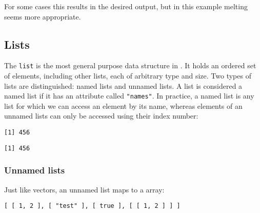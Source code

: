 For some cases this results in the desired output, but in this example melting seems more appropriate.

\subsection{Lists}

The \texttt{list} is the most general purpose data structure in \R.  It holds an ordered set of elements, including other lists, each of arbitrary type and size. Two types of lists are distinguished: named lists and unnamed lists. A list is considered a named list if it has an attribute called \texttt{"names"}. In practice, a named list is any list for which we can access an element by its name, whereas elements of an unnamed lists can only be accessed using their index number:

\begin{knitrout}\mycodesize
{}\color{fgcolor}\begin{kframe}
\begin{alltt}
 \hlkwb{<-} \hlstd{(} \hlstd{=} \hlstd{,}  \hlstd{=} \hlstd{)}
\hlopt{$}
\end{alltt}
\begin{verbatim}
[1] 456
\end{verbatim}
\begin{alltt}
 \hlkwb{<-} \hlstd{(}\hlstd{,} \hlstd{)}
\hlstd{(mylist2[[}\hlstd{]])}
\end{alltt}
\begin{verbatim}
[1] 456
\end{verbatim}
\end{kframe}
\end{knitrout}


\subsubsection{Unnamed lists}

Just like vectors, an unnamed list maps to a \JSON array:

\begin{knitrout}\mycodesize
{}\color{fgcolor}\begin{kframe}
\begin{alltt}
\hlstd{(}\hlstd{(}\hlstd{(}\hlstd{(}\hlstd{,} \hlstd{),} \hlstd{,} \hlstd{,} \hlstd{(}\hlstd{(}\hlstd{,} \hlstd{)))))}
\end{alltt}
\begin{verbatim}
[ [ 1, 2 ], [ "test" ], [ true ], [ [ 1, 2 ] ] ]
\end{verbatim}
\end{kframe}
\end{knitrout}


